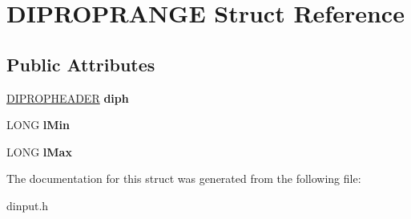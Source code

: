 \hypertarget{struct_d_i_p_r_o_p_r_a_n_g_e}{\section{D\-I\-P\-R\-O\-P\-R\-A\-N\-G\-E Struct Reference}
\label{struct_d_i_p_r_o_p_r_a_n_g_e}
}
\subsection*{Public Attributes}
\begin{DoxyCompactItemize}
\item 
\hypertarget{struct_d_i_p_r_o_p_r_a_n_g_e_aedbab081d6de04848e13cc3f2daf830d}{\hyperlink{struct_d_i_p_r_o_p_h_e_a_d_e_r}{D\-I\-P\-R\-O\-P\-H\-E\-A\-D\-E\-R} {\bfseries diph}}\label{struct_d_i_p_r_o_p_r_a_n_g_e_aedbab081d6de04848e13cc3f2daf830d}

\item 
\hypertarget{struct_d_i_p_r_o_p_r_a_n_g_e_a6cd8d017e5379f65cfeae9739cd059b1}{L\-O\-N\-G {\bfseries l\-Min}}\label{struct_d_i_p_r_o_p_r_a_n_g_e_a6cd8d017e5379f65cfeae9739cd059b1}

\item 
\hypertarget{struct_d_i_p_r_o_p_r_a_n_g_e_ae4414fca6c6c30ced1612b5d9f417310}{L\-O\-N\-G {\bfseries l\-Max}}\label{struct_d_i_p_r_o_p_r_a_n_g_e_ae4414fca6c6c30ced1612b5d9f417310}

\end{DoxyCompactItemize}


The documentation for this struct was generated from the following file\-:\begin{DoxyCompactItemize}
\item 
dinput.\-h\end{DoxyCompactItemize}
